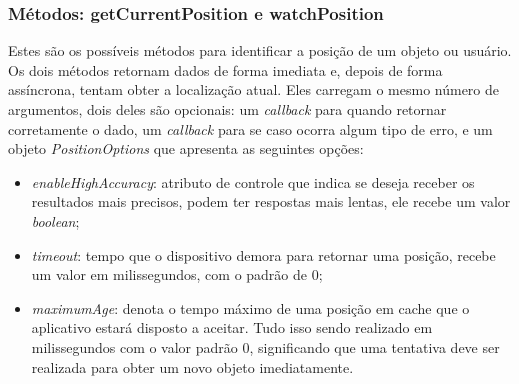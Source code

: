 \subsubsection{Métodos: getCurrentPosition e watchPosition}


Estes são os possíveis métodos para identificar a posição de um objeto ou usuário. Os dois métodos retornam dados de forma imediata e, depois de forma assíncrona, tentam obter a localização atual. Eles carregam o mesmo número de argumentos, dois deles são opcionais: um \textit{callback} para quando retornar corretamente o dado, um \textit{callback} para se caso ocorra algum tipo de erro, e um objeto \textit{PositionOptions} que apresenta as seguintes opções:

\begin{itemize}
    \item \textit{enableHighAccuracy}: atributo de controle que indica se deseja receber os resultados mais precisos, podem ter respostas mais lentas, ele recebe um valor \textit{boolean};
    \item \textit{timeout}: tempo que o dispositivo demora para retornar uma posição, recebe um valor em milissegundos, com o padrão de 0;
    \item \textit{maximumAge}: denota o tempo máximo de uma posição em cache que o aplicativo estará disposto a aceitar. Tudo isso sendo realizado em milissegundos com o valor padrão 0, significando que uma tentativa deve ser realizada para obter um novo objeto imediatamente.
\end{itemize}


